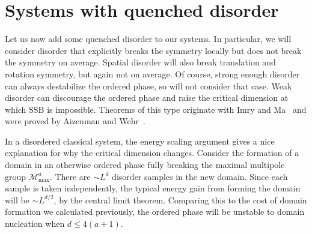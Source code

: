 \documentclass[pra,aps,twocolumn, amsfonts,amsmath,amssymb,nofootinbib,superscriptaddress]{revtex4-2}
\newcommand{\todo}[1]{\textcolor{orange}{#1}}
\newcommand{\charlie}[1]{\textcolor{Blue}{#1}}
\renewcommand{\max}{\text{max}}
\newcommand{\cl}{\text{cl}}
\newcommand{\q}{\text{q}}
\newcommand{\mmax}[1]{\mathcal{M}^{#1}_\max}
\newcommand{\ethan}[1]{ { \color{blue} \footnotesize \textsf{ethan: \textsl{#1}} }}
\begin{document}




\section{Systems with quenched disorder} \label{sec:disord}

Let us now add some quenched disorder to our systems. In particular, we will consider disorder that explicitly breaks the symmetry locally but does not break the symmetry on average. Spatial disorder will also break translation and rotation symmetry, but again not on average. Of course, strong enough disorder can always destabilize the ordered phase, so will not consider that case. Weak disorder can discourage the ordered phase and raise the critical dimension at which SSB is impossible. Theorems of this type originate with Imry and Ma~\cite{ImryMa} and were proved by Aizenman and Wehr~\cite{Aizenman}.

In a disordered classical system, the energy scaling argument gives a nice explanation for why the critical dimension changes. Consider the formation of a domain in an otherwise ordered phase fully breaking the maximal multipole group $\mathcal{M}^a_\max$. There are $\sim L^d$ disorder samples in the new domain. Since each sample is taken independently, the typical energy gain from forming the domain will be $\sim L^{d/2}$, by the central limit theorem. Comparing this to the cost of domain formation we calculated previously, the ordered phase will be unstable to domain nucleation when $d\le 4(a+1)$. 
\end{document}
